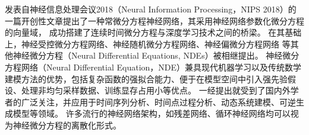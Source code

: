 
发表自神经信息处理会议2018（Neural Information Processing，NIPS 2018）的一篇开创性文章\cite{chen2018neural}提出了一种常微分方程神经网络，其采用神经网络参数化微分方程的向量域\cite{kidger2021}，
成功搭建了连续时间微分方程与深度学习技术之间的桥梁。
在其基础上，神经受控微分方程网络\cite{kidger2020neural}、神经随机微分方程网络\cite{li2020scalable}、神经偏微分方程网络
\cite{li2020fourier}等其他神经微分方程（Neural Differential Equations, NDEs）被相继提出。
神经微分方程网络（Neural Differential Equation，NDE）兼具现代机器学习以及传统数学建模方法的优势，包括复杂函数的强拟合能力、便于在模型空间中引入强先验假设、处理非均匀采样数据、训练显存占用小等优点。
一经提出就受到了国内外学者的广泛关注，并应用于时间序列分析、时间点过程分析、动态系统建模、可逆生成模型等领域。
许多流行的神经网络架构，如残差网络、循环神经网络均可以视为神经微分方程的离散化形式。


